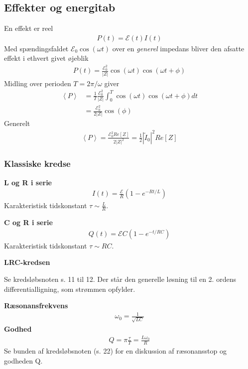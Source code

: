 \documentclass[a4paper]{article}
\begin{document}
    \subsection{Effekter og energitab} 
    En effekt er reel \begin{align*}
        P(t) = \mathcal{E} (t) I(t) \tag{K(66)}
    \end{align*}
    Med spændingsfaldet \(\mathcal{E} _0 \cos (\omega t)\) over en \textit{generel} impedans bliver den afsatte effekt i ethvert givet øjeblik \begin{align*}
        P(t) = \frac{\mathcal{E}_0^2}{|Z|} \cos (\omega t) \cos (\omega t + \phi )  \tag{K(67)}
    \end{align*}
    Midling over perioden \(T = 2\pi  / \omega \) giver \begin{align*}
        \left\langle P \right\rangle &= \frac{1}{T} \frac{\mathcal{E}_0 ^2}{|Z|} \int _0 ^T \cos (\omega t) \cos (\omega t + \phi )dt \\
        &=  \frac{\mathcal{E}_0 ^2}{2|Z|} \cos (\phi ) \tag{K(68)}
    \end{align*} 
    Generelt \begin{align*}
        \boxed{\left\langle P \right\rangle = \frac{\mathcal{E}_0 ^2 Re[Z] }{2|Z|^2} = \frac{1}{2}\left| \tilde{I}_0 \right| ^{2} Re[Z]} \tag{K(69)}
    \end{align*}
    \subsubsection{Klassiske kredse}
    \textbf{L og R i serie}
    \begin{align*}
        I(t) = \frac{\mathcal{E}}{R} ( 1 - e^{- R t / L}) \tag{K(35)}
    \end{align*} 
    Karakteristisk tidskonstant \(\tau \sim \frac{L}{R}\).
    
    \textbf{C og R i serie}
    \begin{align*}
        Q(t) = \mathcal{E} C (1 - e^{- t / RC}) \tag{K(38)}
    \end{align*} 
    Karakteristisk tidskonstant \(\tau \sim RC\). 
    
    \textbf{LRC-kredsen}
    
    Se kredsløbsnoten s. 11 til 12. Der står den generelle løsning til en 2. ordens differentialligning, som strømmen opfylder.
    
    \textbf{Ræsonansfrekvens}\begin{align*}
        \boxed{\omega _0 = \frac{1}{\sqrt{LC} }}\tag{K(74)}
    \end{align*} 
    \textbf{Godhed}  
    \begin{align*}
        Q = \pi  \frac{\tau}{T} = \frac{L \omega _0}{R}
    \end{align*}
    Se bunden af kredsløbsnoten (s. 22) for en diskussion af ræsonansstop og godheden Q.
    
\end{document}
